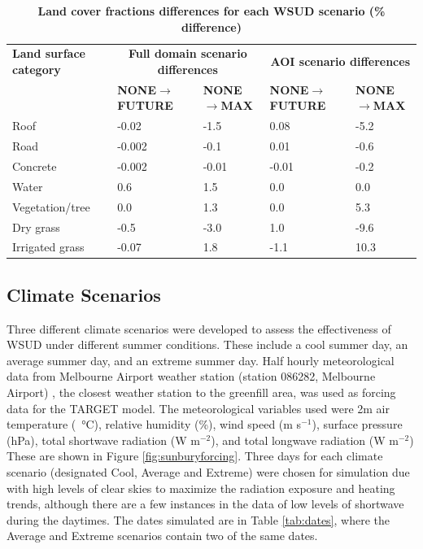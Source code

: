 \documentclass[final,3p,times,authoryear]{elsarticle}
\begin{document}
\begin{table}[!htbp]
\caption{\bf Land cover fractions differences for each WSUD scenario (\% difference)  \label{tab:parametersDiff}}     
\begin{tabular}{ l l l l l }
\hline  \textbf{Land surface category } &  \multicolumn{2}{|c|}{\textbf{Full domain scenario differences}} & \multicolumn{2}{c|}{\textbf{AOI scenario differences}}  \\ 
\textbf{} & \textbf{NONE$\rightarrow$FUTURE}   & \textbf{NONE$\rightarrow$MAX}& \textbf{NONE$\rightarrow$FUTURE} &  \textbf{NONE$\rightarrow$MAX}  \\ \hline
Roof	&-0.02&-1.5&0.08&-5.2\\		
Road	&-0.002&-0.1&0.01&-0.6\\		
Concrete&-0.002&-0.01&-0.01&-0.2\\	
Water	&0.6&1.5&0.0&0.0\\
Vegetation/tree &0.0&1.3&0.0&5.3\\
Dry grass &-0.5&-3.0&1.0&-9.6\\
Irrigated grass	&-0.07&1.8&-1.1&10.3\\	
\hline
\end{tabular}
\end{table}








\subsection{Climate Scenarios}\label{sec:methods_climate_scenarios}

Three different climate scenarios were developed to assess the effectiveness of WSUD under different summer conditions. These include a cool summer day, an average summer day, and an extreme summer day. Half hourly meteorological data from Melbourne Airport weather station (station 086282, Melbourne Airport) \citep{BOM2016b}, the closest weather station to the greenfill area, was used as forcing data for the TARGET model. The meteorological variables used were 2m air temperature (\SI{}{\degreeCelsius}), relative humidity (\%), wind speed (m s$^{-1}$), surface pressure (hPa), total shortwave radiation (W m$^{-2}$), and total longwave radiation (W m$^{-2}$) These are shown in Figure \ref{fig:sunburyforcing}. Three days for each climate scenario (designated Cool, Average and Extreme) were chosen for simulation due with high levels of clear skies to maximize the radiation exposure and heating trends, although there are a few instances in the data of low levels of shortwave during the daytimes. The dates simulated are in Table \ref{tab:dates}, where the Average and Extreme scenarios contain two of the same dates.
\end{document}
